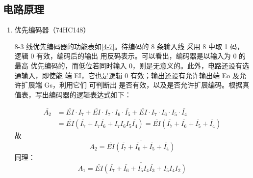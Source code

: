 \subsection{电路原理}

\begin{enumerate}
  \item 优先编码器（74HC148）
  
  8-3 线优先编码器的功能表如\cref{4-7}。待编码的 8 条输入线 采用 8 中取 1 
  码，逻辑 0 有效，编码后的输出 用反码表示。可以看出，编码器是以输入为 0 的最高
  优先编码的，而低位若同时输入 0，则是无意义的。此外，电路还设有选通输入，即使能
  端 EI，它也是逻辑 0 有效；输出还设有允许输出端 Eo 及允许扩展端 Gs，利用它们
  可判断出 是否有效，以及是否允许扩展编码。根据真值表，写出编码器的逻辑表达式如下：

  \begin{equation}
    \begin{aligned}
      \overline{A_2}&=\overline{EI}\cdot I_7+\overline{EI}\cdot I_7\cdot I_6\cdot\overline{I_5}+\overline{EI}\cdot I_7\cdot I_6\cdot I_5\cdot\overline{I_4}\\
      &=\overline{EI}(\overline{I_7}+I_7\overline{I_6}+I_7I_6I_5\overline{I_4})=\overline{EI}(\overline{I_7}+\overline{I_6}+\overline{I_5}+\overline{I_4})
    \end{aligned}
  \end{equation}
  故
  \begin{equation}
    A_2=\overline{\overline{EI}(\overline{I_7}+\overline{I_6}+\overline{I_5}+\overline{I_4})}
  \end{equation}
  同理：
  \begin{equation}
    A_1=\overline{\overline{EI}(\overline{I_7}+\overline{I_6}+I_5I_4\overline{I_3}+I_5I_4I_2)}
  \end{equation}


\end{enumerate}
